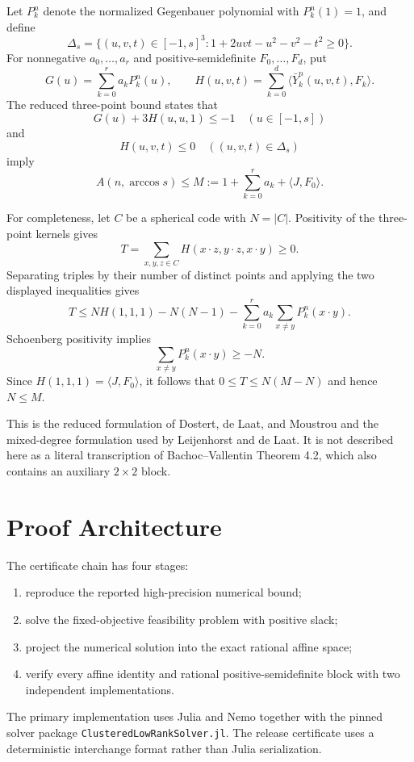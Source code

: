 \documentclass[11pt]{article}
\begin{document}
Let $P_k^n$ denote the normalized Gegenbauer polynomial with
$P_k^n(1)=1$, and define
\[
 \Delta_s=\{(u,v,t)\in[-1,s]^3:
 1+2uvt-u^2-v^2-t^2\geq0\}.
\]
For nonnegative $a_0,\ldots,a_r$ and positive-semidefinite
$F_0,\ldots,F_d$, put
\[
 G(u)=\sum_{k=0}^r a_kP_k^n(u),\qquad
 H(u,v,t)=\sum_{k=0}^d
 \langle\bar Y_k^n(u,v,t),F_k\rangle.
\]
The reduced three-point bound states that
\[
 G(u)+3H(u,u,1)\leq-1\quad(u\in[-1,s])
\]
and
\[
 H(u,v,t)\leq0\quad((u,v,t)\in\Delta_s)
\]
imply
\[
 A(n,\arccos s)\leq
 M:=1+\sum_{k=0}^r a_k+\langle J,F_0\rangle.
\]

For completeness, let $C$ be a spherical code with $N=|C|$. Positivity of
the three-point kernels gives
\[
 T=\sum_{x,y,z\in C}
 H(x\mathbin{\cdot}z,y\mathbin{\cdot}z,x\mathbin{\cdot}y)\geq0.
\]
Separating triples by their number of distinct points and applying the two
displayed inequalities gives
\[
 T\leq NH(1,1,1)-N(N-1)
 -\sum_{k=0}^r a_k\sum_{x\ne y}P_k^n(x\mathbin{\cdot}y).
\]
Schoenberg positivity implies
\[
 \sum_{x\ne y}P_k^n(x\mathbin{\cdot}y)\geq-N.
\]
Since $H(1,1,1)=\langle J,F_0\rangle$, it follows that
$0\leq T\leq N(M-N)$ and hence $N\leq M$.

This is the reduced formulation of Dostert, de Laat, and Moustrou
\cite{DLM} and the mixed-degree formulation used by Leijenhorst and de Laat.
It is not described here as a literal transcription of Bachoc--Vallentin
Theorem 4.2, which also contains an auxiliary $2\times2$ block.

\section{Proof Architecture}

The certificate chain has four stages:
\begin{enumerate}
  \item reproduce the reported high-precision numerical bound;
  \item solve the fixed-objective feasibility problem with positive slack;
  \item project the numerical solution into the exact rational affine space;
  \item verify every affine identity and rational positive-semidefinite block
        with two independent implementations.
\end{enumerate}

The primary implementation uses Julia and Nemo together with the pinned
solver package \texttt{ClusteredLowRankSolver.jl}. The release certificate
uses a deterministic interchange format rather than Julia serialization.
\end{document}
